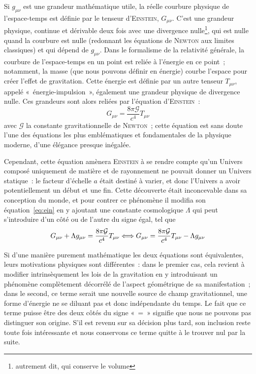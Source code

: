 \documentclass[../main/main.tex]{subfiles}
\begin{document}
Si $g_{\mu\nu}$ est une grandeur mathématique utile, la réelle courbure physique
de l'espace-temps est définie par le tenseur d'\textsc{Einstein}, $G_{\mu\nu}$.
C'est une grandeur physique, continue et dérivable deux fois avec une divergence
nulle\footnote{autrement dit, qui conserve le volume}, qui est nulle quand la
courbure est nulle (redonnant les équations de \textsc{Newton} aux limites
classiques) et qui dépend de $g_{\mu\nu}$. Dans le formalisme de la relativité
générale, la courbure de l'espace-temps en un point est reliée à l'énergie en ce
point~; notamment, la masse (que nous pouvons définir en énergie) courbe
l'espace pour créer l'effet de gravitation. Cette énergie est définie par un
autre tenseur $T_{\mu\nu}$, appelé «~énergie-impulsion~», également une grandeur
physique de divergence nulle. Ces grandeurs sont alors reliées par l'équation
d'\textsc{Einstein}~:
\begin{equation}\label{eq:ein}
    G_{\mu\nu} = \frac{8\pi\mathcal{G}}{c^4}T_{\mu\nu}
\end{equation}
avec $\mathcal{G}$ la constante gravitationnelle de \textsc{Newton}~; cette
équation est sans doute l'une des équations les plus emblématiques et
fondamentales de la physique moderne, d'une élégance presque inégalée.

Cependant, cette équation amènera \textsc{Einstein} à se rendre compte qu'un
Univers composé uniquement de matière et de rayonnement ne pouvait donner un
Univers statique~: le facteur d'échelle $a$ était destiné à varier, et donc
l'Univers a avoir potentiellement un début et une fin. Cette découverte était
inconcevable dans sa conception du monde, et pour contrer ce phénomène il
modifia son équation~\ref{eq:ein} en y ajoutant une constante cosmologique
$\Lambda$ qui peut s'introduire d'un côté ou de l'autre du signe égal, tel que
\begin{equation}\label{eq:einlamb}
    G_{\mu\nu} + \Lambda g_{\mu\nu} = \frac{8\pi\mathcal{G}}{c^4}T_{\mu\nu}
    \Longleftrightarrow
    G_{\mu\nu} = \frac{8\pi\mathcal{G}}{c^4}T_{\mu\nu} - \Lambda g_{\mu\nu} 
\end{equation}

Si d'une manière purement mathématique les deux équations sont équivalentes,
leurs motivations physiques sont différentes~: dans le premier cas, cela revient
à modifier intrinsèquement les lois de la gravitation en y introduisant un
phénomène complètement décorrélé de l'aspect géométrique de sa manifestation~;
dans le second, ce terme serait une nouvelle source de champ gravitationnel, une
forme d'énergie ne se diluant pas et donc indépendante du temps. Le fait que ce
terme puisse être des deux côtés du signe «~=~» signifie que nous ne pouvons pas
distinguer son origine. S'il est revenu sur sa décision plus tard, son inclusion
reste toute fois intéressante et nous conservons ce terme quitte à le trouver
nul par la suite.
\end{document}
